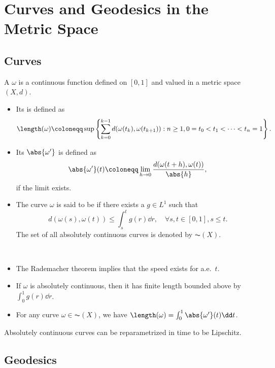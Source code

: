 \documentclass[oneside,reqno,letterpaper]{amsart}
\begin{document}
\section{Curves and Geodesics in the Metric Space}
\subsection{Curves}
\begin{definition}
  A  \(\omega\) is a continuous function defined on \([0, 1]\) and valued in a metric space \((X, d)\).
  \begin{itemize}
    \item Its  is defined as
      \[
        \length(\omega)
        \coloneqq \sup\left\{\sum_{k = 0}^{k - 1} d(\omega(t_k), \omega(t_{k + 1})): n \geq 1, 0 = t_0 < t_1 < \dots < t_n = 1 \right\}.
      \]
    \item Its  \(\abs{\omega'}\) is defined as
      \[
        \abs{\omega'}(t) \coloneqq \lim_{h \to 0} \frac{d(\omega(t + h), \omega(t))}{\abs{h}},
      \]
      if the limit exists.
    \item The curve \(\omega\) is said to be  if there exists a \(g \in L^1\) such that
      \[
        d(\omega(s), \omega(t)) \leq \int_s^t g(r) \dd r, \quad \forall s, t \in [0, 1], s \leq t.
      \]
      The set of all absolutely continuous curves is denoted by \(\AC(X)\).
  \end{itemize}
\end{definition}


\begin{remark}~
  \begin{itemize}
    \item The Rademacher theorem implies that the speed exists for a.e.\ \(t\).
    \item If \(\omega\) is absolutely continuous, then it has finite length bounded above by \(\int_0^1 g(r) \dd r\).
      \item For any curve \(\omega \in \AC(X)\), we have \(\length(\omega) = \int_0^1 \abs{\omega'}(t) \dd t\).
  \end{itemize}
\end{remark}


\begin{proposition}
  Absolutely continuous curves can be reparametrized in time to be Lipschitz.
\end{proposition}


\subsection{Geodesics}
\end{document}
